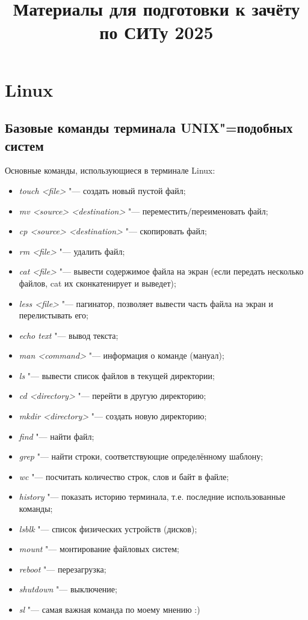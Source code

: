 \documentclass[12pt]{article}
\begin{document}
\author{}
\title{Материалы для подготовки к зачёту по СИТу 2025}
\date{}
\maketitle

\section{Linux}

\subsection{Базовые команды терминала UNIX"=подобных систем}
Основные команды, использующиеся в терминале Linux:
\begin{itemize}
\item \textit{touch <file>} "--- создать новый пустой файл;
\item \textit{mv <source> <destination>} "--- переместить/переименовать файл;
\item \textit{cp <source> <destination>} "--- скопировать файл;
\item \textit{rm <file>} "--- удалить файл;
\item \textit{cat <file>} "--- вывести содержимое файла на экран (если передать несколько файлов, cat их сконкатенирует и выведет);
\item \textit{less <file>} "--- пагинатор, позволяет вывести часть файла на экран и перелистывать его;
\item \textit{echo \glqq text \grqq} "--- вывод текста;
\item \textit{man <command>} "--- информация о команде (мануал);
\item \textit{ls} "--- вывести список файлов в текущей директории;
\item \textit{cd <directory>} "--- перейти в другую директорию;
\item \textit{mkdir <directory>} "--- создать новую директорию;
\item \textit{find} "--- найти файл;
\item \textit{grep} "--- найти строки, соответствующие определённому шаблону;
\item \textit{wc} "--- посчитать количество строк, слов и байт в файле;
\item \textit{history} "--- показать историю терминала, т.е. последние использованные команды;
\item \textit{lsblk} "--- список физических устройств (дисков);
\item \textit{mount} "--- монтирование файловых систем;
\item \textit{reboot} "--- перезагрузка;
\item \textit{shutdown} "--- выключение;
\item \textit{sl} "--- самая важная команда по моему мнению :)
\end{itemize}
\end{document}
